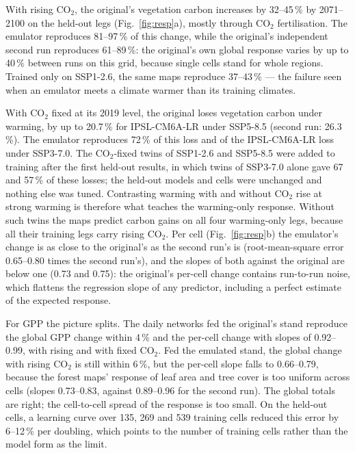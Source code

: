 \documentclass[11pt,a4paper]{article}
\begin{document}
With rising CO$_2$, the original's vegetation carbon increases by 32--45\,\% by 2071--2100 on the held-out legs
(Fig.~\ref{fig:resp}a), mostly through CO$_2$ fertilisation. The emulator reproduces 81--97\,\% of this change, while
the original's independent second run reproduces 61--89\,\%: the original's own global response varies by up to
40\,\% between runs on this grid, because single cells stand for whole regions. Trained only on SSP1-2.6, the same
maps reproduce 37--43\,\% --- the failure seen when an emulator meets a climate warmer than its training climates.

With CO$_2$ fixed at its 2019 level, the original loses vegetation carbon under warming, by up to 20.7\,\% for
IPSL-CM6A-LR under SSP5-8.5 (second run: 26.3\,\%). The emulator reproduces 72\,\% of this loss and of the
IPSL-CM6A-LR loss under SSP3-7.0. The CO$_2$-fixed twins of SSP1-2.6 and SSP5-8.5 were added to training after the
first held-out results, in which twins of SSP3-7.0 alone gave 67 and 57\,\% of these losses; the held-out models and
cells were unchanged and nothing else was tuned. Contrasting warming with and without CO$_2$ rise at strong warming is
therefore what teaches the warming-only response. Without such twins the maps predict carbon gains on all four warming-only legs, because all their training
legs carry rising CO$_2$. Per cell (Fig.~\ref{fig:resp}b) the emulator's change is as close to the original's as the
second run's is (root-mean-square error 0.65--0.80 times the second run's), and the slopes of both against the
original are below one (0.73 and 0.75): the original's per-cell change contains run-to-run noise, which flattens the
regression slope of any predictor, including a perfect estimate of the expected response.

For GPP the picture splits. The daily networks fed the original's stand reproduce the global GPP change within 4\,\%
and the per-cell change with slopes of 0.92--0.99, with rising and with fixed CO$_2$. Fed the emulated stand, the
global change with rising CO$_2$ is still within 6\,\%, but the per-cell slope falls to 0.66--0.79, because the forest
maps' response of leaf area and tree cover is too uniform across cells (slopes 0.73--0.83, against 0.89--0.96 for the
second run). The global totals are right; the cell-to-cell spread of the response is too small. On the held-out cells,
a learning curve over 135, 269 and 539 training cells reduced this error by 6--12\,\% per doubling, which points to the
number of training cells rather than the model form as the limit.
\end{document}
